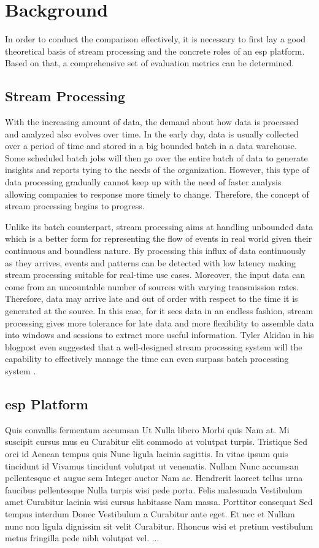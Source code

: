 \chapter{Background} \label{chap:background}
In order to conduct the comparison effectively, it is necessary to first lay a good theoretical basis of stream processing and the concrete roles of an \acrlong{esp} platform. Based on that, a comprehensive set of evaluation metrics can be determined.

\section{Stream Processing}
With the increasing amount of data, the demand about how data is processed and analyzed also evolves over time. In the early day, data is usually collected over a period of time and stored in a big bounded batch in a data warehouse. Some scheduled batch jobs will then go over the entire batch of data to generate insights and reports tying to the needs of the organization. However, this type of data processing gradually cannot keep up with the need of faster analysis allowing companies to response more timely to change. Therefore, the concept of stream processing begins to progress.


Unlike its batch counterpart, stream processing aims at handling unbounded data which is a better form for representing the flow of events in real world given their continuous and boundless nature. By processing this influx of data continuously as they arrives, events and patterns can be detected with low latency making stream processing suitable for real-time use cases. Moreover, the input data can come from an uncountable number of sources with varying transmission rates. Therefore, data may arrive late and out of order with respect to the time it is generated at the source. In this case, for it sees data in an endless fashion, stream processing gives more tolerance for late data and more flexibility to assemble data into windows and sessions to extract more useful information. Tyler Akidau in his blogpost even suggested that a well-designed stream processing system will the capability to effectively manage the time can even surpass batch processing system \cite{stream101}.
\section{\acrlong{esp} Platform}
Quis convallis fermentum accumsan Ut Nulla libero Morbi quis Nam at. Mi suscipit cursus mus eu Curabitur elit commodo at volutpat turpis. Tristique Sed orci id Aenean tempus quis Nunc ligula lacinia sagittis. In vitae ipsum quis tincidunt id Vivamus tincidunt volutpat ut venenatis. Nullam Nunc accumsan pellentesque et augue sem Integer auctor Nam ac. Hendrerit laoreet tellus urna faucibus pellentesque Nulla turpis wisi pede porta. Felis malesuada Vestibulum amet Curabitur lacinia wisi cursus habitasse Nam massa. Porttitor consequat Sed tempus interdum Donec Vestibulum a Curabitur ante eget. Et nec et Nullam nunc non ligula dignissim sit velit Curabitur. Rhoncus wisi et pretium vestibulum metus fringilla pede nibh volutpat vel. ...

